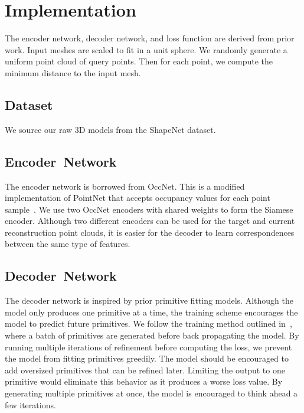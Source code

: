 
\chapter{Implementation}
\label{chap:implementation}

The encoder network, decoder network, and loss function are derived from prior work. Input meshes are scaled to fit in a unit sphere. We randomly generate a uniform point cloud of query points. Then for each point, we compute the minimum distance to the input mesh.


\section{Dataset}
\label{sec:dataset}

We source our raw 3D models from the ShapeNet dataset. 


\section{Encoder~Network}
\label{sec:encoder_network}

The encoder network is borrowed from OccNet. This is a modified implementation of PointNet that accepts occupancy values for each point sample~\cite{Mescheder2019}. We use two OccNet encoders with shared weights to form the Siamese encoder. Although two different encoders can be used for the target and current reconstruction point clouds, it is easier for the decoder to learn correspondences between the same type of features.


\section{Decoder~Network}
\label{sec:decoder_network}

The decoder network is inspired by prior primitive fitting models. Although the model only produces one primitive at a time, the training scheme encourages the model to predict future primitives. We follow the training method outlined in~\cite{Kleineberg2020}, where a batch of primitives are generated before back propagating the model. By running multiple iterations of refinement before computing the loss, we prevent the model from fitting primitives greedily. The model should be encouraged to add oversized primitives that can be refined later. Limiting the output to one primitive would eliminate this behavior as it produces a worse loss value. By generating multiple primitives at once, the model is encouraged to think ahead a few iterations.


